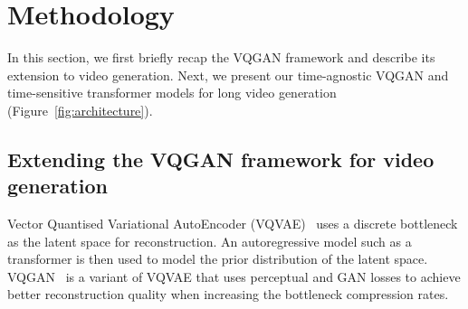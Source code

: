 \section{Methodology}
\label{sec:method}
In this section, we first briefly recap the VQGAN framework and describe its extension to video generation. 
Next, we present our time-agnostic VQGAN and time-sensitive transformer models for long video generation (Figure~\ref{fig:architecture}).

\subsection{Extending the VQGAN framework for video generation}

Vector Quantised Variational AutoEncoder (VQVAE)~\cite{van2017neural}
uses a discrete bottleneck as the latent space for reconstruction. 
An autoregressive model such as a transformer is then used to model the prior distribution of the latent space. 
VQGAN~\cite{esser2021taming} is a variant of VQVAE that uses perceptual and GAN losses to achieve better reconstruction quality when increasing the bottleneck compression rates.

